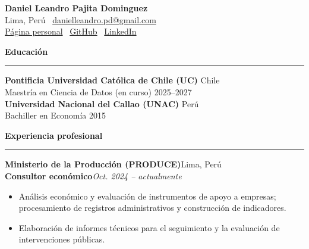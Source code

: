 \documentclass[11pt,a4paper]{article}
\newcommand{\seccion}[1]{%
  \vspace{8pt}
  \begin{center}\textbf{#1}\end{center}
  \vspace{-5pt}\hrule\vspace{7pt}
}
\newcommand{\cargo}[4]{%
  \textbf{#1}\hfill #2\\
  \textbf{#3}\hfill \textit{#4}\par\vspace{2pt}
}
\newenvironment{funciones}{%
  \begin{itemize}[
    leftmargin=1.1em,
    itemsep=1pt,
    topsep=2pt,
    parsep=0pt
  ]
}{\end{itemize}\vspace{3pt}}
\begin{document}

\begin{center}

  {\Large\textbf{Daniel Leandro Pajita Dominguez}}\\[4pt]

  Lima, Perú \textbullet\
  \href{mailto:danielleandro.pd@gmail.com}
  {danielleandro.pd@gmail.com}\\[3pt]

  \href{https://danielpajita.github.io/}{Página personal}
  \textbullet\
  \href{https://github.com/DanielPajita}{GitHub}
  \textbullet\
  \href{https://www.linkedin.com/in/daniel-leandro-pajita-dominguez-93657a265/}{LinkedIn}\\[4pt]

  \hrulefill

\end{center}


\seccion{Educación}

\textbf{Pontificia Universidad Católica de Chile (UC)}
\hfill Chile\\
Maestría en Ciencia de Datos (en curso)
\hfill 2025--2027\\[5pt]

\textbf{Universidad Nacional del Callao (UNAC)}
\hfill Perú\\
Bachiller en Economía
\hfill 2015


\seccion{Experiencia profesional}


\cargo
  {Ministerio de la Producción (PRODUCE)}
  {Lima, Perú}
  {Consultor económico}
  {Oct. 2024 -- actualmente}

\begin{funciones}

  \item Análisis económico y evaluación de instrumentos de apoyo a empresas; procesamiento de registros administrativos y construcción de indicadores.

  \item Elaboración de informes técnicos para el seguimiento y la evaluación de intervenciones públicas.

\end{funciones}
\end{document}
